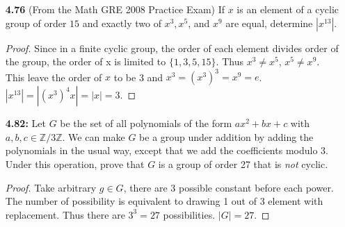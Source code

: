 \documentclass[11pt, oneside]{article}
\newcommand{\Z}{\mathbb Z}
\newcommand{\Q}{\mathbb Q}
\begin{document}
\begin{enumerate}
\begin{enumerate}
\begin{proof}
Let H be an arbitrary finitely generated group of $\Q$: $H=\langle A \rangle$. We aim to show $H\leq \langle \frac{1}{k}\rangle$, where $k$ is the product of all denominators which appear in a set of generators for $H$. Under the same operation, $\langle \frac{1}{k}\rangle$ form a cyclic group. For arbitrary $h\in H$, h can be expressed as a linear combination of elements of A. Since each element of A is a multiple of $\frac{1}{k}$: $h=\frac{p}{k}$ where p is a multiple of k. Thus $h\in \langle \frac{1}{k}\rangle$. $H\leq \langle \frac{1}{k}\rangle$.

Since the subgroup of cyclic group is also cyclic, H is cyclic. 
\end{proof}
\item Prove that $\Q$ is not finitely generated.
\begin{proof}
Assume $\Q$ is finitely generated, $\Q=\langle A \rangle$. Using the same reasoning and setting above, $\langle A \rangle \leq \langle \frac{1}{k}\rangle$. This shows $\Q$ is cyclic under addition which is not true. $\Rightarrow\Leftarrow$.
\end{proof}
\end{enumerate}

\newpage
\item[{\bf 4.76}] (From the Math GRE 2008 Practice Exam) If $x$ is an element of a cyclic group of order $15$ and exactly two of $x^3, x^5$, and $x^9$ are equal, determine $|x^{13}|$.

\begin{proof}
Since in a finite cyclic group, the order of each element divides order of the group, the order of x is limited to $\{1, 3, 5,15\}$. Thus $x^3\neq x^5$, $x^5 \neq x^9$. This leave the order of $x$ to be 3 and $x^3=(x^3)^3=x^9=e$. $|x^{13}|= |(x^3)^4x|=|x|=3$.
\end{proof}

\newpage
\item[{\bf 4.82:}] Let $G$ be the set of all polynomials of the form $ax^2+bx+c$ with $a,b,c\in \Z/3\Z$. We can make $G$ be a group under addition by adding the polynomials in the usual way, except that we add the coefficients modulo 3. Under this operation, prove that $G$ is a group of order 27 that is {\it not} cyclic.

\begin{proof}
Take arbitrary $g\in G$, there are 3 possible constant before each power. The number of possibility is equivalent to drawing 1 out of 3 element with replacement. Thus there are $3^3=27$ possibilities. $|G|=27$. 


\end{proof}
\end{enumerate}
\end{document}
